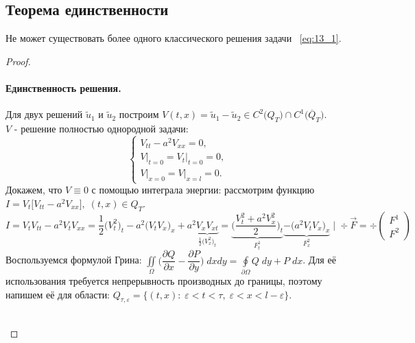 \documentclass[../main.tex]{subfiles}
\begin{document}
\subsection{Теорема единственности}
\begin{theorem}[Единственности]
Не может существовать более одного классического решения задачи ~\ref{eq:13_1}.
\end{theorem}
\begin{proof}
\paragraph{Единственность решения.}
Для двух решений $\tilde{u}_{1}$ и $\tilde{u}_{2}$  построим $V(t, x) = \tilde{u}_{1} - \tilde{u}_{2} \in C^{2}\bigl(Q_{T}\bigr) \cap C^{1}\bigl(\overline{Q}_{T}\bigr)$.\\$V$ - решение полностью однородной задачи:
\begin{equation*}
\begin{cases}
V_{tt} - a^2V_{xx} = 0, \\
V\bigr|_{t = 0} = V_t\bigr|_{t = 0} = 0, \\
V\bigr|_{x = 0} = V\bigr|_{x = l} = 0.
\end{cases}
\end{equation*}
Докажем, что $V \equiv 0$ с помощью интеграла энергии: рассмотрим функцию $I = V_{t}\bigl[V_{tt} - a^2V_{xx}\bigr],\; (t, x) \in Q_{T}$.
\begin{equation*}
I = V_{t}V_{tt} - a^2V_{t}V_{xx} = \dfrac{1}{2}\bigl(V_{t}^{2}\bigr)_{t} - a^2\bigl(V_{t}V_{x}
\bigr)_{x} + a^2\underbrace{V_{x}V_{xt}}_{\frac{1}{2} \bigl(V_{x}^{2}\bigr)_{t}} = \underbrace{\biggl(\dfrac{V_{t}^2 + a^2V_{x}^{2}}{2}\biggr)_{t}}_{F^1_t}  \underbrace{ - \bigl(a^{2}V_{t}V_{x}\bigr)_{x}}_{F_{x}^{2}}\; \biggr|\; \div\vec{F} = \div \begin{pmatrix}
F^1 \\
F^2
\end{pmatrix}
\end{equation*}
Воспользуемся формулой Грина: $\iint\limits_{\Omega}\bigl(\dfrac{\partial Q}{\partial x} - \dfrac{\partial P}{\partial y}\bigr)\;dxdy = \oint\limits_{\partial \Omega}Q\;dy + P\;dx$.
Для её использования требуется непрерывность производных до границы, поэтому напишем её для области: $Q_{\tau, \varepsilon} = \{(t, x)\colon\; \varepsilon < t < \tau,\; \varepsilon < x < l - \varepsilon\}$.\\
\ \\
\begin{minipage}[c]{0.2\textwidth}
\begin{center}
\end{center}
\end{minipage}
\end{proof}
\end{document}
